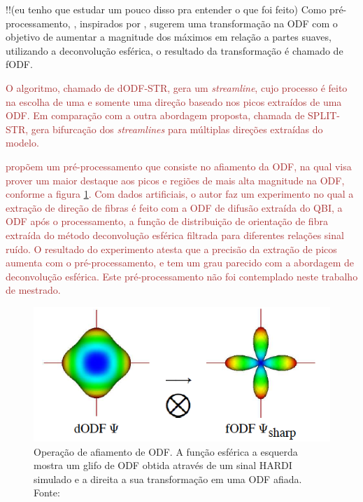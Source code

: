\documentclass[
    12pt,                %
    oneside,            %
    a4paper,            %
    english,            %
    french,                %
    spanish,            %
    brazil                %
    ]{abntex2}
\begin{document}
!!(eu tenho que estudar um pouco disso pra entender o que foi feito)
Como pré-processamento, , inspirados por , sugerem uma transformação na ODF com o objetivo de aumentar a magnitude dos máximos em relação a partes suaves, utilizando a deconvolução esférica, o resultado da transformação é chamado de fODF.


\textcolor{brown}{
 O algoritmo, chamado de dODF-STR, gera um \textit{streamline}, cujo processo é feito na escolha de uma e somente uma direção baseado nos picos extraídos de uma ODF. Em comparação com a outra abordagem proposta, chamada de SPLIT-STR, gera bifurcação dos \textit{streamlines} para múltiplas direções extraídas do modelo.
}




\textcolor{brown}{
 propõem um pré-processamento que consiste no afiamento da ODF, na qual visa prover um maior destaque aos picos e regiões de mais alta magnitude na ODF, conforme a figura \ref{fig::sharpening}. Com dados artificiais, o autor faz um experimento no qual a extração de direção de fibras é feito com a ODF de difusão extraída do QBI, a ODF após o processamento, a função de distribuição de orientação de fibra extraída do método deconvolução esférica filtrada para diferentes relações sinal ruído. O resultado do experimento atesta que a precisão da extração de picos aumenta com o pré-processamento, e tem um grau parecido com a abordagem de deconvolução esférica. Este pré-processamento não foi contemplado neste trabalho de mestrado.
}

\begin{figure}[h]
    \centering
    \includegraphics[width=.45\linewidth, angle=0]{figs/Tractografia/sharpening.png}
     \caption{Operação de afiamento de ODF. A função esférica a esquerda mostra um glifo de ODF obtida através de um sinal HARDI simulado e a direita a sua transformação em uma ODF afiada. \\
     Fonte: \cite{descoteaux2007}
     }
     \label{fig::sharpening}
\end{figure}
\end{document}
